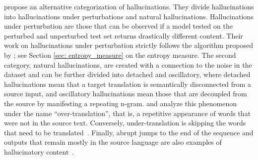  propose an alternative categorization of hallucinations. They divide hallucinations into hallucinations under perturbations and natural hallucinations. Hallucinations under perturbation are those that can be observed if a model tested on the perturbed and unperturbed test set returns drastically different content. Their work on hallucinations under perturbation strictly follows the algorithm proposed by ; see Section \ref{sec: entropy_measure} on the entropy measure. The second category, natural hallucinations, are created with a connection to the noise in the dataset and can be further divided into detached and oscillatory, where detached hallucinations mean that a target translation is semantically disconnected from a source input, and oscillatory hallucinations mean those that are decoupled from the source by manifesting a repeating n-gram.  and  analyze this phenomenon under the name “over-translation”, that is, a repetitive appearance of words that were not in the source text. Conversely, under-translation is skipping the words that need to be translated~. Finally, abrupt jumps to the end of the sequence and outputs that remain mostly in the source language are also examples of hallucinatory content~.
